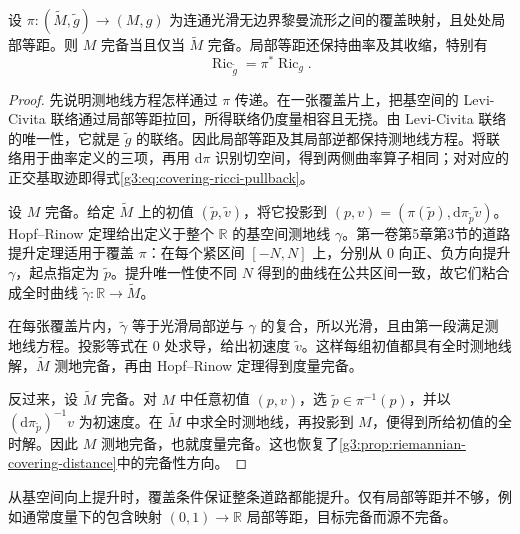 \begin{proposition}\label{g3:prop:riemannian-cover-complete}
	设 \(\pi:(\widetilde M,\widetilde g)\to(M,g)\) 为连通光滑无边界黎曼流形之间的覆盖映射，且处处局部等距。则 \(M\) 完备当且仅当 \(\widetilde M\) 完备。局部等距还保持曲率及其收缩，特别有
	\begin{equation}\label{g3:eq:covering-ricci-pullback}
		\operatorname{Ric}_{\widetilde g}=\pi^*\operatorname{Ric}_g.
	\end{equation}
\end{proposition}
\begin{proof}
	先说明测地线方程怎样通过 \(\pi\) 传递。在一张覆盖片上，把基空间的 Levi-Civita 联络通过局部等距拉回，所得联络仍度量相容且无挠。由 Levi-Civita 联络的唯一性，它就是 \(\widetilde g\) 的联络。因此局部等距及其局部逆都保持测地线方程。将联络用于曲率定义的三项，再用 \(\mathrm{d}\pi\) 识别切空间，得到两侧曲率算子相同；对对应的正交基取迹即得式\eqref{g3:eq:covering-ricci-pullback}。

	设 \(M\) 完备。给定 \(\widetilde M\) 上的初值 \((\widetilde p,\widetilde v)\)，将它投影到 \((p,v)=(\pi(\widetilde p),\mathrm{d}\pi_{\widetilde p}\widetilde v)\)。Hopf--Rinow 定理给出定义于整个 \(\mathbb R\) 的基空间测地线 \(\gamma\)。第一卷第5章第3节的道路提升定理适用于覆盖 \(\pi\)：在每个紧区间 \([-N,N]\) 上，分别从 \(0\) 向正、负方向提升 \(\gamma\)，起点指定为 \(\widetilde p\)。提升唯一性使不同 \(N\) 得到的曲线在公共区间一致，故它们粘合成全时曲线 \(\widetilde\gamma:\mathbb R\to\widetilde M\)。

	在每张覆盖片内，\(\widetilde\gamma\) 等于光滑局部逆与 \(\gamma\) 的复合，所以光滑，且由第一段满足测地线方程。投影等式在 \(0\) 处求导，给出初速度 \(\widetilde v\)。这样每组初值都具有全时测地线解，\(\widetilde M\) 测地完备，再由 Hopf--Rinow 定理得到度量完备。

	反过来，设 \(\widetilde M\) 完备。对 \(M\) 中任意初值 \((p,v)\)，选 \(\widetilde p\in\pi^{-1}(p)\)，并以 \((\mathrm{d}\pi_{\widetilde p})^{-1}v\) 为初速度。在 \(\widetilde M\) 中求全时测地线，再投影到 \(M\)，便得到所给初值的全时解。因此 \(M\) 测地完备，也就度量完备。这也恢复了\cref{g3:prop:riemannian-covering-distance}中的完备性方向。
\end{proof}

从基空间向上提升时，覆盖条件保证整条道路都能提升。仅有局部等距并不够，例如通常度量下的包含映射 \((0,1)\to\mathbb R\) 局部等距，目标完备而源不完备。

